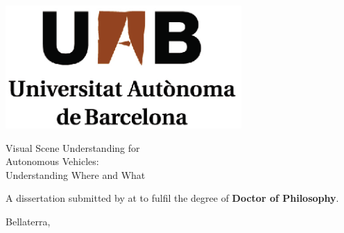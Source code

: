 \makeatletter
\begin{titlepage}
\begin{center}
\sffamily

\includegraphics[width=9cm]{images/LogoUAB}

\null\vspace{2cm}
{\Huge Visual Scene Understanding for\\[1mm] Autonomous Vehicles:\\[4mm] Understanding Where and What}  
\vfill

\end{center}

\vfill
\begin{flushright}
  \parbox{7.5cm}{A dissertation submitted by {\bf \@author} at \UAB to fulfil the degree of \textbf{Doctor of Philosophy}.\par
   \vspace*{2mm}
   \hfill Bellaterra, \@date
  }
\end{flushright}
  
\end{titlepage}

